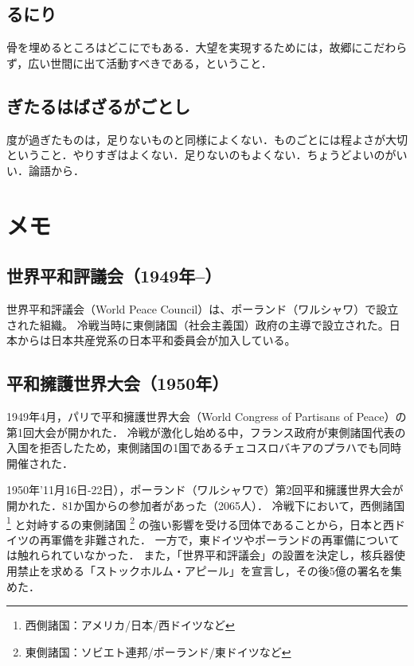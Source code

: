             \subsection{るにり}
            骨を埋めるところはどこにでもある．大望を実現するためには，故郷にこだわらず，広い世間に出て活動すべきである，ということ．

            \subsection{ぎたるはばざるがごとし}
            度が過ぎたものは，足りないものと同様によくない．ものごとには程よさが大切ということ．やりすぎはよくない．足りないのもよくない．ちょうどよいのがいい．論語から．

        \section{メモ}
        \subsection{世界平和評議会（1949年--）}
        世界平和評議会（World Peace Council）は、ポーランド（ワルシャワ）で設立された組織。
        冷戦当時に東側諸国（社会主義国）政府の主導で設立された。日本からは日本共産党系の日本平和委員会が加入している。
        
        \subsection{平和擁護世界大会（1950年）}
        1949年4月，パリで平和擁護世界大会（World Congress of Partisans of Peace）の第1回大会が開かれた．
        冷戦が激化し始める中，フランス政府が東側諸国代表の入国を拒否したため，東側諸国の1国であるチェコスロバキアのプラハでも同時開催された．
        
        1950年’11月16日-22日），ポーランド（ワルシャワで）第2回平和擁護世界大会が開かれた．81か国からの参加者があった（2065人）．
        冷戦下において，西側諸国
        \footnote{西側諸国：アメリカ/日本/西ドイツなど}
        と対峙するの東側諸国
        \footnote{東側諸国：ソビエト連邦/ポーランド/東ドイツなど}
        の強い影響を受ける団体であることから，日本と西ドイツの再軍備を非難された．
        一方で，東ドイツやポーランドの再軍備については触れられていなかった．
        また，「世界平和評議会」の設置を決定し，核兵器使用禁止を求める「ストックホルム・アピール」を宣言し，その後5億の署名を集めた．

